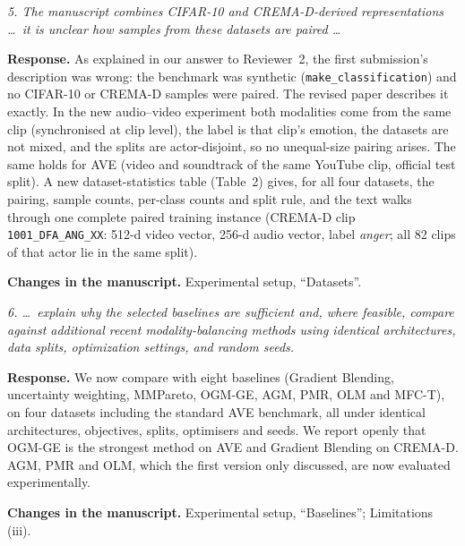 \documentclass[11pt,a4paper]{article}
\newcommand{\rc}[1]{\par\noindent\colorbox{gray!12}{\parbox{\dimexpr\linewidth-2\fboxsep}{\small\textit{#1}}}\par}
\newcommand{\resp}{\par\noindent\textbf{Response.} }
\newcommand{\chg}{\par\noindent\textbf{Changes in the manuscript.} }
\begin{document}
\rc{5. The manuscript combines CIFAR-10 and CREMA-D-derived representations \ldots\ it is unclear how samples from these datasets are paired \ldots}
\resp As explained in our answer to Reviewer~2, the first submission's description was wrong: the benchmark was synthetic (\texttt{make\_classification}) and no CIFAR-10 or CREMA-D samples were paired. The revised paper describes it exactly. In the new audio--video experiment both modalities come from the same clip (synchronised at clip level), the label is that clip's emotion, the datasets are not mixed, and the splits are actor-disjoint, so no unequal-size pairing arises. The same holds for AVE (video and soundtrack of the same YouTube clip, official test split). A new dataset-statistics table (Table~2) gives, for all four datasets, the pairing, sample counts, per-class counts and split rule, and the text walks through one complete paired training instance (CREMA-D clip \texttt{1001\_DFA\_ANG\_XX}: 512-d video vector, 256-d audio vector, label \emph{anger}; all 82 clips of that actor lie in the same split).
\chg Experimental setup, ``Datasets''.

\rc{6. \ldots\ explain why the selected baselines are sufficient and, where feasible, compare against additional recent modality-balancing methods using identical architectures, data splits, optimization settings, and random seeds.}
\resp We now compare with eight baselines (Gradient Blending, uncertainty weighting, MMPareto, OGM-GE, AGM, PMR, OLM and MFC-T), on four datasets including the standard AVE benchmark, all under identical architectures, objectives, splits, optimisers and seeds. We report openly that OGM-GE is the strongest method on AVE and Gradient Blending on CREMA-D. AGM, PMR and OLM, which the first version only discussed, are now evaluated experimentally.
\chg Experimental setup, ``Baselines''; Limitations (iii).
\end{document}
